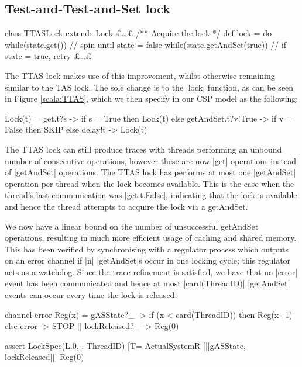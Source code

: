 \subsection{Test-and-Test-and-Set lock}


\begin{scala}[caption={TTAS lock from \cite{CADS}}, label={scala:TTAS}]
class TTASLock extends Lock{ 
  £\dots£
  /** Acquire the lock */
  def lock = 
    do{
      while(state.get()){ } // spin until state = false
    } while(state.getAndSet(true)) // if state = true, retry
  £\dots£
}
\end{scala}

The TTAS lock makes use of this improvement, whilst otherwise remaining similar to the TAS lock. The sole change is to the |lock| function, as can be seen in Figure \ref{scala:TTAS}, which we then specify in our CSP model as the following: 
\begin{cspm}
Lock(t) =  get.t?s -> if s = True then Lock(t)
                      else getAndSet.t?v!True -> if v = False then SKIP
                                                 else delay!t -> Lock(t)
\end{cspm}
The TTAS lock can still produce traces with threads performing an unbound number of consecutive operations, however these are now |get| operations instead of |getAndSet| operations. %
The TTAS lock has performs at most one |getAndSet| operation per thread when the lock becomes available. This is the case when the thread's last communication was |get.t.False|, indicating that the lock is available and hence the thread attempts to acquire the lock via a getAndSet.

We now have a linear bound on the number of unsuccessful getAndSet operations, resulting in much more efficient usage of caching and shared memory. This has been verified by synchronising with a regulator process which outputs on an error channel if |n| |getAndSet|s occur in one locking cycle; this regulator acts as a watchdog. Since the trace refinement is satisfied, we have that no |error| event has been communicated and hence at most |card(ThreadID)| |getAndSet| events can occur every time the lock is released. %

\begin{cspm}
channel error
Reg(x) =    gASState?_ -> if (x < card(ThreadID)) then Reg(x+1)
                          else error -> STOP
         [] lockReleased?_ -> Reg(0)

assert LockSpec(L.0, {}, ThreadID) 
         [T= ActualSystemR [|{|gASState, lockReleased|}|] Reg(0)
\end{cspm}

